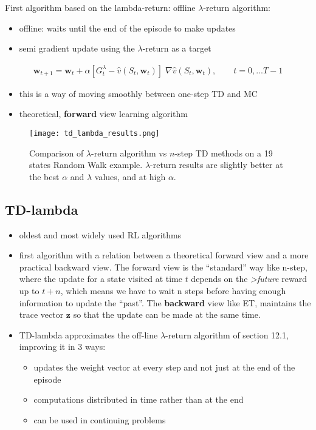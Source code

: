 \documentclass[sutton_barto_notes.tex]{subfiles}
\begin{document}
 First algorithm based on the lambda-return: offline $\lambda$-return algorithm: 
\begin{itemize}
\item offline: waits until the end of the episode to make updates 
\item semi gradient update using the $\lambda$-return as a target 
\end{itemize}
\begin{align}\mathbf{w}_{t+1} = \mathbf{w}_t + \alpha[G_t^{\lambda} - \hat{v}(S_t, \mathbf{w}_t)] \; \nabla \hat{v}(S_t, \mathbf{w}_t), \quad \quad t = 0, ... T-1 \label{eq:12.3}\tag{12.3}\end{align}
\begin{itemize}
\item this is a way of moving smoothly between one-step TD and MC 
\item theoretical, \textbf{forward} view learning algorithm 
\end{itemize}
\begin{figure}[h!]
    \centering
     \texttt{[image: td\_lambda\_results.png]}
    \caption{ Comparison of $\lambda$-return algorithm vs $n$-step TD methods on a 19 states Random Walk example. $\lambda$-return results are slightly better at the best $\alpha$ and $\lambda$ values, and at high $\alpha$. }
\end{figure}

\newpage
\subsection{TD-lambda}

\begin{itemize}
\item oldest and most widely used RL algorithms 
\item first algorithm with a relation between a theoretical forward view and a more practical backward view. The forward view is the “standard” way like n-step, where the update for a state visited at time $t$ depends on the \textit{>future} reward up to $t+n$, which means we have to wait n steps before having enough information to update the “past”. The \textbf{backward} view like ET, maintains the trace vector $\mathbf{z}$ so that the update can be made at the same time. 
\item TD-lambda approximates the off-line $\lambda$-return algorithm of section 12.1, improving it in 3 ways:
    \begin{itemize}
    \item updates the weight vector at every step and not just at the end of the episode 
    \item computations distributed in time rather than at the end 
    \item can be used in continuing problems 
    \end{itemize}
   
\end{itemize}
\end{document}
